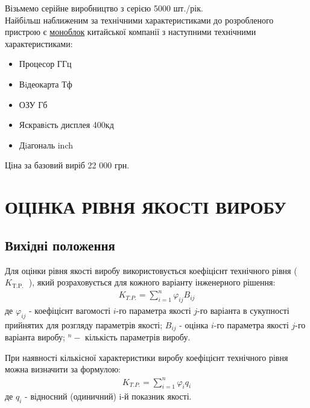\documentclass[a4paper,14pt]{extreport}
\begin{document}
    Візьмемо серійне виробництво з серією 5000 шт./рік.\\ 

    Найбільш наближеним за технічними характеристиками до розробленого
    пристрою  є  \href{https://www.itbox.ua/ua/product/Kompyuter_HP_24-df0054ua_IPS_Pentium_J5040_426F3EA-p702646/?utm=shopping&utm_content=shopping&gclid=CjwKCAiAtdGNBhAmEiwAWxGcUoFSjhq16_yyk_vusMuu-Nb1aAfwNXYS7bWDjVH86uK1hBbyGcG11BoCPasQAvD_BwE}{моноблок}  китайської  компанії  з  наступними  технічними
    характеристиками:
    \begin{itemize}
    \item Процесор  ГГц 
    \item Вiдеокарта  Тф
    \item ОЗУ  Гб
    \item Яскравiсть дисплея \dotfill 400кд
    \item Дiагональ  inch
    \end{itemize}
    Ціна за базовий виріб 22 000 грн.



\chapter{ОЦІНКА РІВНЯ ЯКОСТІ ВИРОБУ}

\section{Вихідні положення}
    Для оцінки рівня якості виробу використовується коефіціснт технічного рівня ( $K_{\text {T.P. }}$ ), який розраховується для кожного варіанту інженерного рішення:
    \begin{align}
    K_{T . P .}=\sum_{i=1}^{n} \varphi_{i j} B_{i j}
    \end{align}
    де $\varphi_{i j}$ - коефіціснт вагомості $i$-го параметра якості $j$-го варіанта в сукупності прийнятих для розгляду параметрів якості; $B_{i j}$ - оцінка $i$-го параметра якості $j$-го варіанта виробу; $^{n}-$ кількість параметрів виробу.

    При наявності кількісної характеристики виробу коефіцієнт технічного рівня можна визначити за формулою:
    \begin{align}
    K_{T. P.}=\sum_{i=1}^{n} \varphi_{i} q_{i}
    \end{align}
    де $q_{i}$ - відносний (одиничний)   i-й показник якості. 
\end{document}
